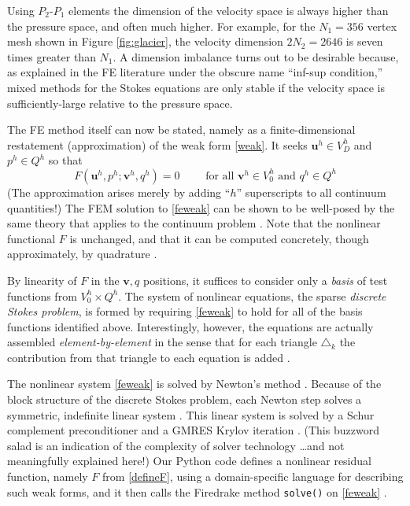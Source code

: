 \documentclass[letterpaper,final,12pt,reqno]{amsart}
\newcommand{\bu}{\mathbf{u}}
\newcommand{\bv}{\mathbf{v}}
\begin{document}
Using $P_2$-$P_1$ elements the dimension of the velocity space is always higher than the pressure space, and often much higher.  For example, for the $N_1=356$ vertex mesh shown in Figure \ref{fig:glacier}, the velocity dimension $2N_2=2646$ is seven times greater than $N_1$.  A dimension imbalance turns out to be desirable because, as explained in the FE literature \cite{Braess2007,Elmanetal2014} under the obscure name ``inf-sup condition,'' mixed methods for the Stokes equations are only stable if the velocity space is sufficiently-large relative to the pressure space.

The FE method itself can now be stated, namely as a finite-dimensional restatement (approximation) of the weak form \eqref{weak}.  It seeks $\bu^h \in V_D^h$ and $p^h \in Q^h$ so that
\begin{equation}
F(\bu^h,p^h;\bv^h,q^h) = 0 \qquad \text{ for all } \bv^h\in V_0^h \text{ and } q^h\in Q^h  \label{feweak}
\end{equation}
(The approximation arises merely by adding ``$h$'' superscripts to all continuum quantities!)  The FEM solution to \eqref{feweak} can be shown to be well-posed by the same theory that applies to the continuum problem \cite[Theorem 4.3]{JouvetRappaz2011}.  Note that the nonlinear functional $F$ is unchanged, and that it can be computed concretely, though approximately, by quadrature \cite{BuelerBook,Elmanetal2014}.

By linearity of $F$ in the $\bv,q$ positions, it suffices to consider only a \emph{basis} of test functions from $V_0^h \times Q^h$.  The system of nonlinear equations, the sparse \emph{discrete Stokes problem}, is formed by requiring \eqref{feweak} to hold for all of the basis functions identified above.  Interestingly, however, the equations are actually assembled \emph{element-by-element} in the sense that for each triangle $\triangle_k$ the contribution from that triangle to each equation is added \cite[chapter 9]{BuelerBook}.

The nonlinear system \eqref{feweak} is solved by Newton's method \cite{Kelley2003}.  Because of the block structure of the discrete  Stokes problem, each Newton step solves a symmetric, indefinite linear system \cite{GolubVanLoan2013}.  This linear system is solved by a Schur complement \cite{Elmanetal2014,GolubVanLoan2013} preconditioner and a GMRES Krylov iteration \cite{GolubVanLoan2013}.  (This buzzword salad is an indication of the complexity of solver technology \dots and not meaningfully explained here!)  Our Python code defines a nonlinear residual function, namely $F$ from \eqref{defineF}, using a domain-specific language for describing such weak forms, and it then calls the Firedrake method \texttt{solve()} on \eqref{feweak} \cite{Rathgeberetal2016}.
\end{document}

